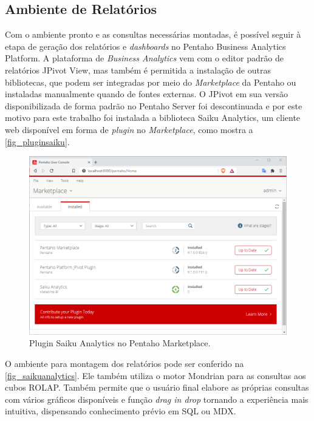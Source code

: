 \subsection{Ambiente de Relatórios}
Com o ambiente pronto e as consultas necessárias montadas, é possível seguir à etapa de geração dos relatórios e \textit{dashboards} no Pentaho Business Analytics Platform. A plataforma de \textit{Business Analytics} vem com o editor padrão de relatórios JPivot View, mas também é permitida a instalação de outras bibliotecas, que podem ser integradas por meio do \textit{Marketplace} da Pentaho ou instaladas manualmente quando de fontes externas. O JPivot em sua versão disponibilizada de forma padrão no Pentaho Server foi descontinuada e por este motivo para este trabalho foi instalada a biblioteca Saiku Analytics, um cliente web disponível em forma de \textit{plugin} no \textit{Marketplace}, como mostra a \autoref{fig_pluginsaiku}. 
\begin{figure}[htb]
	\caption{\label{fig_pluginsaiku}Plugin Saiku Analytics no Pentaho Marketplace.}
	\begin{center}
	    \includegraphics[scale=0.6]{Imagens/figura - pluginsaiku.png}
	\end{center}
\end{figure}

O ambiente para montagem dos relatórios pode ser conferido na \autoref{fig_saikuanalytics}.
Ele também utiliza o motor Mondrian para as consultas aos cubos ROLAP. Também permite que o usuário final elabore as próprias consultas com vários gráficos disponíveis e função \textit{drag in drop} tornando a experiência mais intuitiva, dispensando conhecimento prévio em SQL ou MDX. 

